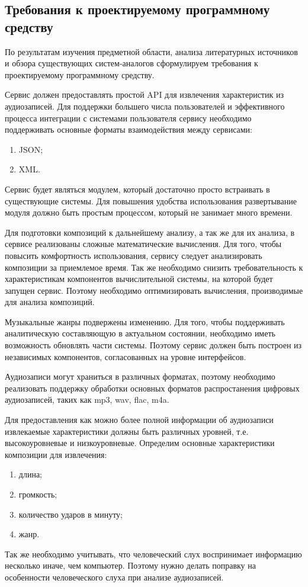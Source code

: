 \subsection{Требования к проектируемому программному средству}
\label{sec:design:specification}

По результатам изучения предметной области, анализа литературных источников и обзора существующих систем-аналогов сформулируем требования к проектируемому программному средству.

Сервис должен предоставлять простой API для извлечения характеристик из аудиозаписей. Для поддержки большего числа пользователей и эффективного процесса интеграции с системами пользователя сервису необходимо поддерживать основные форматы взаимодействия между сервисами:
\begin{enumerate}
  \item JSON;
  \item XML.
\end{enumerate}

Сервис будет являться модулем, который достаточно просто встраивать в существующие системы. Для повышения удобства использования развертывание модуля должно быть простым процессом, который не занимает много времени.

Для подготовки композиций к дальнейшему анализу, а так же для их анализа, в сервисе реализованы сложные математические вычисления. Для того, чтобы повысить комфортность использования, сервису следует анализировать композиции за приемлемое время. Так же необходимо снизить требовательность к характеристикам компонентов вычислительной системы, на которой будет запущен сервис. Поэтому необходимо оптимизировать вычисления, производимые для анализа композиций.

Музыкальные жанры подвержены изменению. Для того, чтобы поддерживать аналитическую составляющую в актуальном состоянии, необходимо иметь возможность обновлять части системы. Поэтому сервис должен быть построен из независимых компонентов, согласованных на уровне интерфейсов.

Аудиозаписи могут храниться в различных форматах, поэтому необходимо реализовать поддержку обработки основных форматов распростанения цифровых аудиозаписей, таких как mp3, wav, flac, m4a.

Для предоставления как можно более полной информации об аудиозаписи извлекаемые характеристики должны быть различных уровней, т.е. высокоуровневые и низкоуровневые. Определим основные характеристики композиции для извлечения:
\begin{enumerate}
  \item длина;
  \item громкость;
  \item количество ударов в минуту;
  \item жанр.
\end{enumerate}

Так же необходимо учитывать, что человеческий слух воспринимает информацию несколько иначе, чем компьютер. Поэтому нужно делать поправку на особенности человеческого слуха при анализе аудиозаписей.

